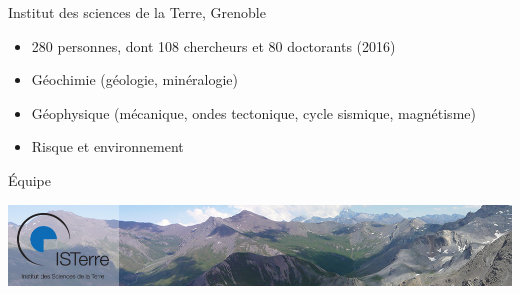 \begin{frame}
	\titlepage 
\end{frame}

\begin{frame}{Institut des sciences de la Terre, Grenoble}
	\begin{itemize}
		\item 280 personnes, dont 108 chercheurs et 80 doctorants (2016)
		\item Géochimie (géologie, minéralogie)
		\item Géophysique (mécanique, ondes tectonique, cycle sismique, magnétisme)
		\item Risque et environnement
	\end{itemize}
	
	Équipe 
	
	\vfill
	\includegraphics[width=\textwidth]{img/bandeau_isterre.jpg}
\end{frame}

